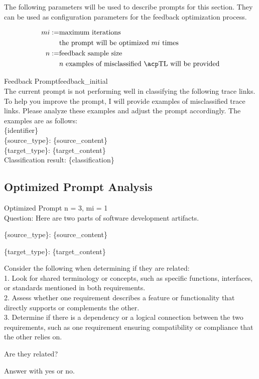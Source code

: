 The following parameters will be used to describe prompts for this section. They can be used as configuration parameters for the feedback optimization process.

\begin{align*}
    mi:=  & \text{maximum iterations}\\
          & \text{the prompt will be optimized $mi$ times} \\
    n  := & \text{feedback sample size}\\  
          & \text{$n$ examples of misclassified \TLs will be provided}
\end{align*}

\begin{prompt}{Feedback Prompt}{feedback_initial}\\
    The current prompt is not performing well in classifying the following trace links. To help you improve the prompt, I will provide examples of misclassified trace links. Please analyze these examples and adjust the prompt accordingly. The examples are as follows: \\
    \{identifier\}\\
    \{source\_type\}: \tripplequote\{source\_content\}\tripplequote\\
    \{target\_type\}: \tripplequote\{target\_content\}\tripplequote\\
    Classification result: \{classification\}
\end{prompt}

\subsection{Optimized Prompt Analysis}

\begin{prompt}{Optimized Prompt n = 3, mi = 1}\\
Question: Here are two parts of software development artifacts.

\{source\_type\}: \tripplequote\{source\_content\}\tripplequote

\{target\_type\}: \tripplequote\{target\_content\}\tripplequote

Consider the following when determining if they are related:\\
1. Look for shared terminology or concepts, such as specific functions, interfaces, or standards mentioned in both requirements.\\
2. Assess whether one requirement describes a feature or functionality that directly supports or complements the other.\\
3. Determine if there is a dependency or a logical connection between the two requirements, such as one requirement ensuring compatibility or compliance that the other relies on.

Are they related?

Answer with \textquotesingle{}yes\textquotesingle{} or \textquotesingle{}no\textquotesingle{}.
\end{prompt}

